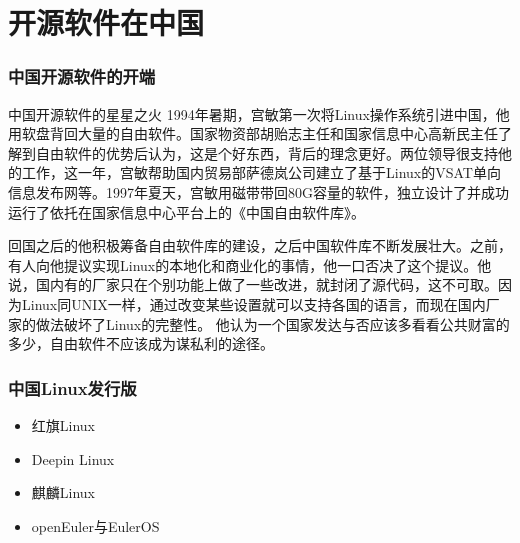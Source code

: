\documentclass{beamer}
\begin{document}
\section{开源软件在中国}
\begin{frame}
    \frametitle{中国开源软件的开端}
    \begin{block}{中国开源软件的星星之火}
1994年暑期，宫敏第一次将Linux操作系统引进中国，他用软盘背回大量的自由软件。国家物资部胡贻志主任和国家信息中心高新民主任了解到自由软件的优势后认为，这是个好东西，背后的理念更好。两位领导很支持他的工作，这一年，宫敏帮助国内贸易部萨德岚公司建立了基于Linux的VSAT单向信息发布网等。1997年夏天，宫敏用磁带带回80G容量的软件，独立设计了并成功运行了依托在国家信息中心平台上的《中国自由软件库》。

回国之后的他积极筹备自由软件库的建设，之后中国软件库不断发展壮大。之前，有人向他提议实现Linux的本地化和商业化的事情，他一口否决了这个提议。他说，国内有的厂家只在个别功能上做了一些改进，就封闭了源代码，这不可取。因为Linux同UNIX一样，通过改变某些设置就可以支持各国的语言，而现在国内厂家的做法破坏了Linux的完整性。 他认为一个国家发达与否应该多看看公共财富的多少，自由软件不应该成为谋私利的途径。
    \end{block}

\end{frame}

\begin{frame}
    \frametitle{中国Linux发行版}
    \begin{block}
        {}
        \begin{itemize}
            \item 红旗Linux
            \item Deepin Linux
            \item 麒麟Linux
            \item openEuler与EulerOS
        \end{itemize}
    \end{block}
\end{frame}
\end{document}
